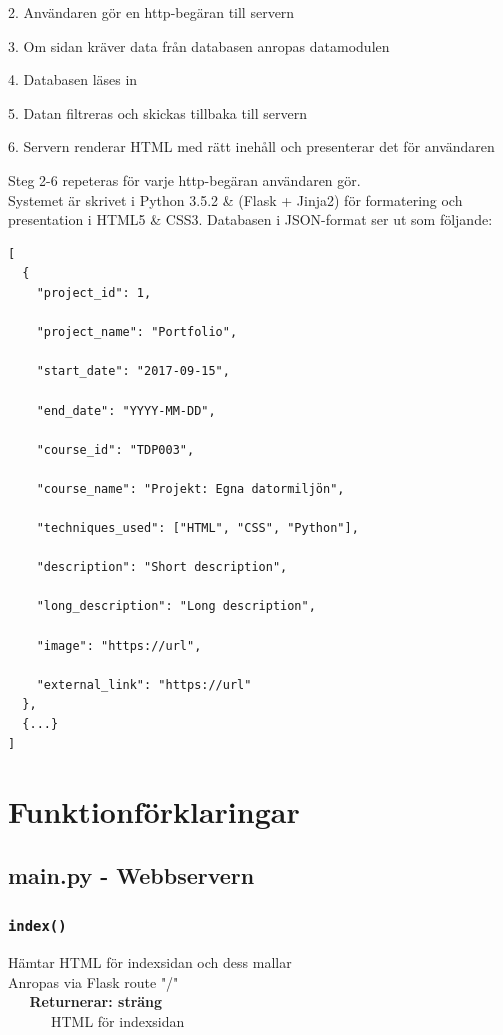 \documentclass{TDP003mall}
\begin{document}
2. Användaren gör en http-begäran till servern

3. Om sidan kräver data från databasen anropas datamodulen

4. Databasen läses in

5. Datan filtreras och skickas tillbaka till servern

6. Servern renderar HTML med rätt inehåll och presenterar det för användaren

Steg 2-6 repeteras för varje http-begäran användaren gör.\\
Systemet är skrivet i Python 3.5.2 \& (Flask + Jinja2) för formatering och presentation i HTML5 \& CSS3.
Databasen i JSON-format ser ut som följande:
\begin{lstlisting}
[
  {
    "project_id": 1,

    "project_name": "Portfolio",

    "start_date": "2017-09-15",

    "end_date": "YYYY-MM-DD",

    "course_id": "TDP003",

    "course_name": "Projekt: Egna datormiljön",

    "techniques_used": ["HTML", "CSS", "Python"],

    "description": "Short description",

    "long_description": "Long description",

    "image": "https://url",

    "external_link": "https://url"
  },
  {...}
]
\end{lstlisting}


\section{Funktionförklaringar}
\subsection{main.py - Webbservern}
\subsubsection{\texttt{index()}}
Hämtar HTML för indexsidan och dess mallar\\
Anropas via Flask route "/"\\

\verb|   |\textbf{Returnerar: sträng}\\
\verb|   |\verb|   |HTML för indexsidan
\end{document}
